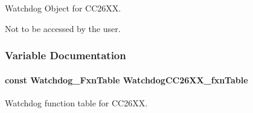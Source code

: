 Watchdog Object for C\+C26\+X\+X. 

Not to be accessed by the user. 

\subsubsection{Variable Documentation}
\paragraph[{Watchdog\+C\+C26\+X\+X\+\_\+fxn\+Table}]{\setlength{\rightskip}{0pt plus 5cm}const {\bf Watchdog\+\_\+\+Fxn\+Table} Watchdog\+C\+C26\+X\+X\+\_\+fxn\+Table}\label{_watchdog_c_c26_x_x_8h_a1f60b940055d37c5bf8545499e948ca3}


Watchdog function table for C\+C26\+X\+X. 

